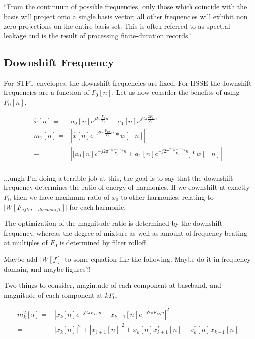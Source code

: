 \documentclass [11pt, proquest] {uwthesis}[2015/03/03]
\begin{document}
``From the continuum of possible frequencies, only those which coincide with the basis will project onto a single basis vector; all other frequencies will exhibit non zero projections on the entire basis set. This is often referred to as spectral leakage and is the result of processing finite-duration records.''

\subsection{Downshift Frequency}


For STFT envelopes, the downshift frequencies are fixed.  For HSSE the downshift frequencies are a function of $F_0[n]$.  Let us now consider the benefits of using $F_0[n]$.


\begin{align}
\widehat{x}[n] =& a_0[n] e^{j2\pi \frac{F_0}{F_s} n} + a_1[n] e^{j2\pi \frac{2F_0}{F_s} n} \\
m_1[n] =& | \widehat{x}[n] e^{-j2\pi \frac{F_{DS}}{F_s} n} * w[-n] | \\
=& | \Big[ a_0[n] e^{-j2\pi \frac{F_0 - F_{DS}}{F_s} n} + a_1[n] e^{-j2\pi \frac{2F_0 - F_{DS}}{F_s} n} \Big] * w[-n] | \\
\end{align}

...ungh I'm doing a terrible job at this, the goal is to say that the downshift frequency determines the ratio of energy of harmonics.  If we downshift at exactly $F_0$ then we have maximum ratio of $x_0$ to other harmonics, relating to $|W[F_{after-downshift}]|$ for each harmonic.

The optimization of the magnitude ratio is determined by the downshift frequency, whereas the degree of mixture as well as amount of frequency beating at multiples of $F_0$ is determined by filter rolloff.

Maybe add $|W[f]|$ to some equation like the following.  Maybe do it in frequency domain, and maybe figures?!

Two things to consider, magintude of each component at baseband, and magnitude of each component at $k F_0$.

\begin{align}
m_k^2[n] =& | x_k[n] e^{-j2\pi F_{DS} n} +  x_{k+1}[n] e^{-j2\pi F_{DS} n}|^2 \nonumber \\
=& | x_k[n] |^2 + | x_{k+1}[n] |^2 + x_k[n]x_{k+1}^*[n]  + x_k^*[n]x_{k+1}[n]
\end{align}
\end{document}
